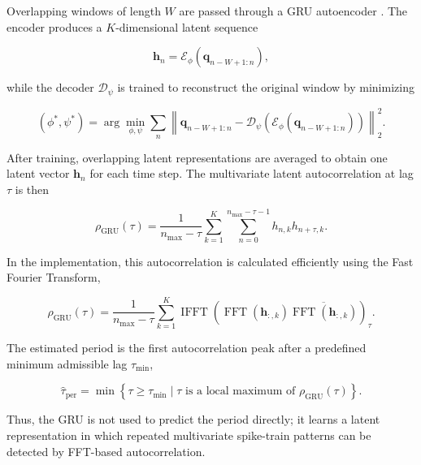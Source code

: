\documentclass[a4paper]{article}
\begin{document}
      Overlapping windows of length $W$ are passed through a GRU autoencoder \cite{cho-2014-learning-phrase-representations-using-rnn-encoder-decoder-for-statistical-machine-translation}. The encoder produces a $K$-dimensional latent sequence

      \[
      \mathbf{h}_n
      =
      \mathcal{E}_{\phi}
      \left(
      \mathbf{q}_{n-W+1:n}
      \right),
      \]

      while the decoder $\mathcal{D}_{\psi}$ is trained to reconstruct the original window by minimizing

      \[
      (\phi^{*},\psi^{*})
      =
      \arg\min_{\phi,\psi}
      \sum_n
      \left\|
      \mathbf{q}_{n-W+1:n}
      -
      \mathcal{D}_{\psi}
      \left(
      \mathcal{E}_{\phi}
      \left(
      \mathbf{q}_{n-W+1:n}
      \right)
      \right)
      \right\|_2^2 .
      \]

      After training, overlapping latent representations are averaged to obtain one latent vector $\mathbf{h}_n$ for each time step. The multivariate latent autocorrelation at lag $\tau$ is then

      \[
      \rho_{\mathrm{GRU}}(\tau)
      =
      \frac{1}{n_{\max}-\tau}
      \sum_{k=1}^{K}
      \sum_{n=0}^{n_{\max}-\tau-1}
      h_{n,k}h_{n+\tau,k}.
      \]

      In the implementation, this autocorrelation is calculated efficiently using the Fast Fourier Transform,

      \[
      \rho_{\mathrm{GRU}}(\tau)
      =
      \frac{1}{n_{\max}-\tau}
      \sum_{k=1}^{K}
      \operatorname{IFFT}
      \left(
      \operatorname{FFT}(\mathbf{h}_{:,k})
      \overline{\operatorname{FFT}(\mathbf{h}_{:,k})}
      \right)_{\tau}.
      \]

      The estimated period is the first autocorrelation peak after a predefined minimum admissible lag $\tau_{\min}$,

      \[
      \hat{\tau}_{\mathrm{per}}
      =
      \min
      \left\{
      \tau \geq \tau_{\min}
      \mid
      \tau \text{ is a local maximum of }
      \rho_{\mathrm{GRU}}(\tau)
      \right\}.
      \]

      Thus, the GRU is not used to predict the period directly; it learns a latent representation in which repeated multivariate spike-train patterns can be detected by FFT-based autocorrelation.
\end{document}
